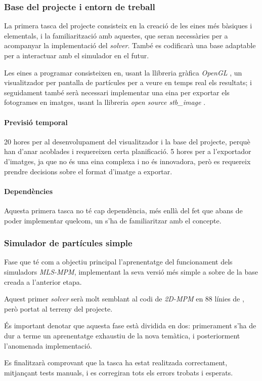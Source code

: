 \documentclass[a4paper]{report}
\begin{document}
	\subsubsection{Base del projecte i entorn de treball}
	La primera tasca del projecte consisteix en la creació de les eines més bàsiques i elementals, i la familiarització amb aquestes, que seran necessàries per a acompanyar la implementació del \textit{solver}. També es codificarà una base adaptable per a interactuar amb el simulador en el futur.\par 
	
	Les eines a programar consisteixen en, usant la llibreria gràfica \textit{OpenGL} \cite{SiliconGraphics2013}, un visualitzador per pantalla de partícules per a veure en temps real els resultats; i seguidament també serà necessari implementar una eina per exportar els fotogrames en imatges, usant la llibreria \textit{open source stb\_image} \cite{stb}. 

	\paragraph{\quad Previsió temporal} 20 hores per al desenvolupament del visualitzador i la base del projecte, perquè han d'anar acoblades i requereixen certa planificació. 5 hores per a l'exportador d'imatges, ja que no és una eina complexa i no és innovadora, però es requereix prendre decisions sobre el format d'imatge a exportar.
	\paragraph{\quad Dependències} Aquesta primera tasca no té cap dependència, més enllà del fet que abans de poder implementar quelcom, un s'ha de familiaritzar amb el concepte.
	\subsubsection{Simulador de partícules simple}
	Fase que té com a objectiu principal l'aprenentatge del funcionament dels simuladors \textit{MLS-MPM}, implementant la seva versió més simple a sobre de la base creada a l'anterior etapa. \par 
	Aquest primer \textit{solver} serà molt semblant al codi de \textit{2D-MPM} en 88 línies de \cite{hu2018mlsmpmcpic}, però portat al terreny del projecte.\par 
	És important denotar que aquesta fase està dividida en dos: primerament s'ha de dur a terme un aprenentatge exhaustiu de la nova temàtica, i posteriorment l'anomenada implementació. \par 
	Es finalitzarà comprovant que la tasca ha estat realitzada correctament, mitjançant tests manuals, i es corregiran tots els errors trobats i esperats.
\end{document}
